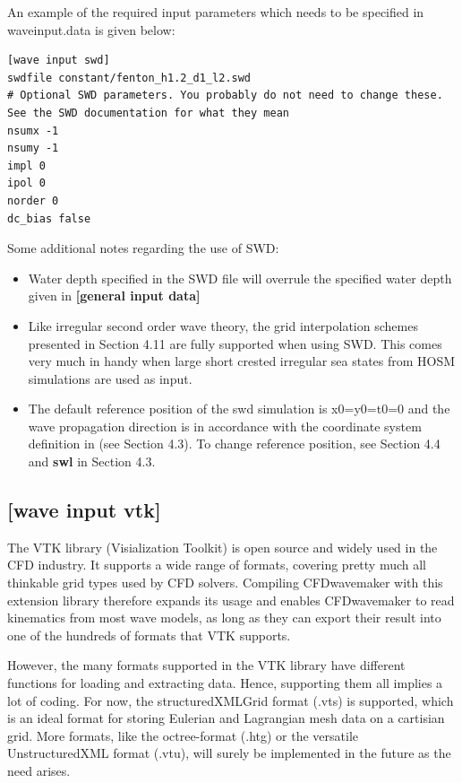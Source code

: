 An example of the required input parameters which needs to be specified in waveinput.data is given below:
\begin{lstlisting}[]
[wave input swd]
swdfile constant/fenton_h1.2_d1_l2.swd
# Optional SWD parameters. You probably do not need to change these. See the SWD documentation for what they mean
nsumx -1
nsumy -1
impl 0
ipol 0
norder 0
dc_bias false
\end{lstlisting}
Some additional notes regarding the use of SWD:
\begin{itemize}
    \item Water depth specified in the SWD file will overrule the specified water depth given in \textbf{[general input data]}
    \item Like irregular second order wave theory, the grid interpolation schemes presented in Section 4.11 are fully supported when using SWD. This comes very much in handy when large short crested irregular sea states from HOSM simulations are used as input.
    \item The default reference position of the swd simulation is x0=y0=t0=0 and the wave propagation direction is in accordance with the coordinate system definition in (see Section 4.3). To change reference position, see Section 4.4 and \textbf{swl} in Section 4.3.
\end{itemize}

\subsection{[wave input vtk]}
The VTK library (Visialization Toolkit) is open source and widely used in the CFD industry. It supports a wide range of formats, covering pretty much all thinkable grid types used by CFD solvers. Compiling CFDwavemaker with this extension library therefore expands its usage and enables CFDwavemaker to read kinematics from most wave models, as long as they can export their result into one of the hundreds of formats that VTK supports.

However, the many formats supported in the VTK library have different functions for loading and extracting data. Hence, supporting them all implies a lot of coding. For now, the structuredXMLGrid format (.vts) is supported, which is an ideal format for storing Eulerian and Lagrangian mesh data on a cartisian grid. More formats, like the octree-format (.htg) or the versatile UnstructuredXML format (.vtu), will surely be implemented in the future as the need arises.

